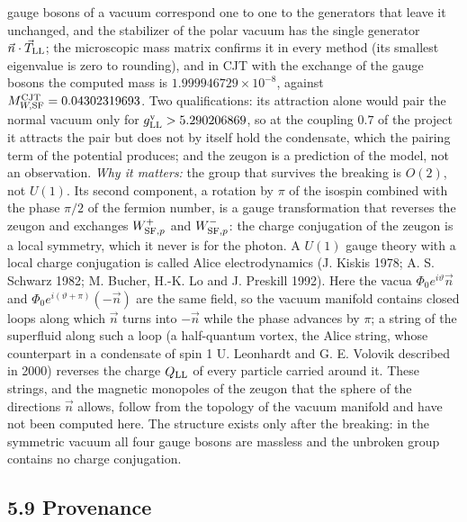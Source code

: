 \documentclass[
  10pt,
]{article}
\begin{document}
\begin{itemize}
  gauge bosons of a vacuum correspond one to one to the generators that
  leave it unchanged, and the stabilizer of the polar vacuum has the
  single generator \(\vec n\cdot\vec T_{\rm LL}\); the microscopic mass
  matrix confirms it in every method (its smallest eigenvalue is zero to
  rounding), and in CJT with the exchange of the gauge bosons the
  computed mass is \(1.999946729\times10^{-8}\), against
  \(M^{\rm CJT}_{W,{\rm SF}}=0.04302319693\). Two qualifications: its
  attraction alone would pair the normal vacuum only for
  \(g^{\rm v}_{\rm LL}>5.290206869\), so at the coupling \(0.7\) of the
  project it attracts the pair but does not by itself hold the
  condensate, which the pairing term of the potential produces; and the
  zeugon is a prediction of the model, not an observation. \emph{Why it
  matters:} the group that survives the breaking is \(O(2)\), not
  \(U(1)\). Its second component, a rotation by \(\pi\) of the isospin
  combined with the phase \(\pi/2\) of the fermion number, is a gauge
  transformation that reverses the zeugon and exchanges
  \(W^+_{{\rm SF},p}\) and \(W^-_{{\rm SF},p}\): the charge conjugation
  of the zeugon is a local symmetry, which it never is for the photon. A
  \(U(1)\) gauge theory with a local charge conjugation is called Alice
  electrodynamics (J. Kiskis 1978; A. S. Schwarz 1982; M. Bucher, H.-K.
  Lo and J. Preskill 1992). Here the vacua
  \(\Phi_0e^{i\vartheta}\vec n\) and
  \(\Phi_0e^{i(\vartheta+\pi)}(-\vec n)\) are the same field, so the
  vacuum manifold contains closed loops along which \(\vec n\) turns
  into \(-\vec n\) while the phase advances by \(\pi\); a string of the
  superfluid along such a loop (a half-quantum vortex, the Alice string,
  whose counterpart in a condensate of spin 1 U. Leonhardt and G. E.
  Volovik described in 2000) reverses the charge \(Q_{\rm LL}\) of every
  particle carried around it. These strings, and the magnetic monopoles
  of the zeugon that the sphere of the directions \(\vec n\) allows,
  follow from the topology of the vacuum manifold and have not been
  computed here. The structure exists only after the breaking: in the
  symmetric vacuum all four gauge bosons are massless and the unbroken
  group contains no charge conjugation.
\end{itemize}

\hypertarget{provenance-2}{%
\subsection{5.9 Provenance}\label{provenance-2}}
\end{document}

